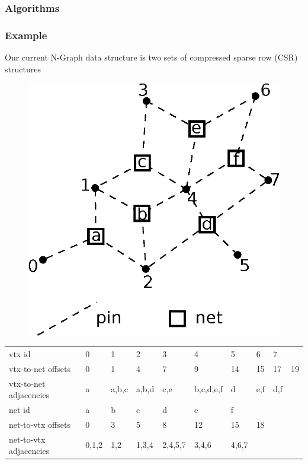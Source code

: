 \documentclass{beamer}
\begin{document}
\begin{frame}
  \frametitle{Algorithms}
\end{frame}

\begin{frame}
  \frametitle{Example}
  Our current N-Graph data structure is two sets of compressed sparse row (CSR)
  structures
  \begin{figure}
    \centering
    \includegraphics[width=.4\textwidth]{figures/hypergraph.eps}
  \end{figure}  
  {\tiny
  \begin{table}[]
    \centering
    \label{my-label}
    \begin{tabular}{llllllllll}
      vtx id                 & 0     & 1     & 2     & 3       & 4         & 5     & 6   & 7   &    \\
      vtx-to-net offsets     & 0     & 1     & 4     & 7       & 9         & 14    & 15  & 17  & 19 \\
      vtx-to-net adjacencies & a     & a,b,c & a,b,d & c,e     & b,c,d,e,f & d     & e,f & d,f &    \\
      \hline
      net id                 & a     & b     & c     & d       & e         & f     &     &     &    \\
      net-to-vtx offsets     & 0     & 3     & 5     & 8       & 12        & 15    & 18  &     &    \\
      net-to-vtx adjacencies & 0,1,2 & 1,2   & 1,3,4 & 2,4,5,7 & 3,4,6     & 4,6,7 &     &     &   
    \end{tabular}
  \end{table}
  }
\end{frame}
\end{document}
